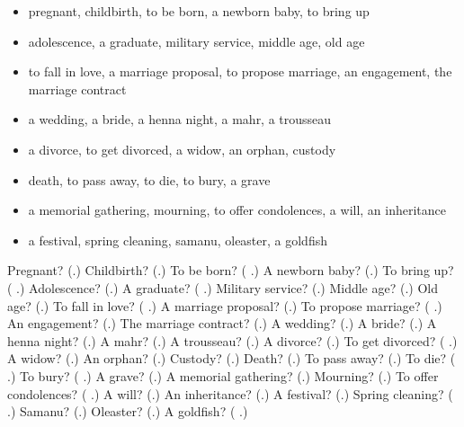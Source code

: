 \begin{itemize}
\raggedright
  \item pregnant, childbirth, to be born, a newborn baby, to bring up
  \item adolescence, a graduate, military service, middle age, old age
  \item to fall in love, a marriage proposal, to propose marriage, an engagement, the marriage contract
  \item a wedding, a bride, a henna night, a mahr, a trousseau
  \item a divorce, to get divorced, a widow, an orphan, custody
  \item death, to pass away, to die, to bury, a grave
  \item a memorial gathering, mourning, to offer condolences, a will, an inheritance
  \item a festival, spring cleaning, samanu, oleaster, a goldfish
\end{itemize}

\begin{tcolorbox}[breakable,colback=teal!4,colframe=teal!35!black,title={Before you move on}]
Pregnant? (\textbf{}.) Childbirth? (\textbf{}.) To be born? (\textbf{  }.) A newborn baby? (\textbf{}.) To bring up? (\textbf{ }.) Adolescence? (\textbf{}.) A graduate? (\textbf{ }.) Military service? (\textbf{}.) Middle age? (\textbf{}.) Old age? (\textbf{}.) To fall in love? (\textbf{ }.) A marriage proposal? (\textbf{}.) To propose marriage? (\textbf{ }.) An engagement? (\textbf{}.) The marriage contract? (\textbf{}.) A wedding? (\textbf{}.) A bride? (\textbf{}.) A henna night? (\textbf{}.) A mahr? (\textbf{}.) A trousseau? (\textbf{}.) A divorce? (\textbf{}.) To get divorced? (\textbf{ }.) A widow? (\textbf{}.) An orphan? (\textbf{}.) Custody? (\textbf{}.) Death? (\textbf{}.) To pass away? (\textbf{}.) To die? (\textbf{ }.) To bury? (\textbf{ }.) A grave? (\textbf{}.) A memorial gathering? (\textbf{}.) Mourning? (\textbf{}.) To offer condolences? (\textbf{ }.) A will? (\textbf{}.) An inheritance? (\textbf{}.) A festival? (\textbf{}.) Spring cleaning? (\textbf{ }.) Samanu? (\textbf{}.) Oleaster? (\textbf{}.) A goldfish? (\textbf{ }.)
\end{tcolorbox}

